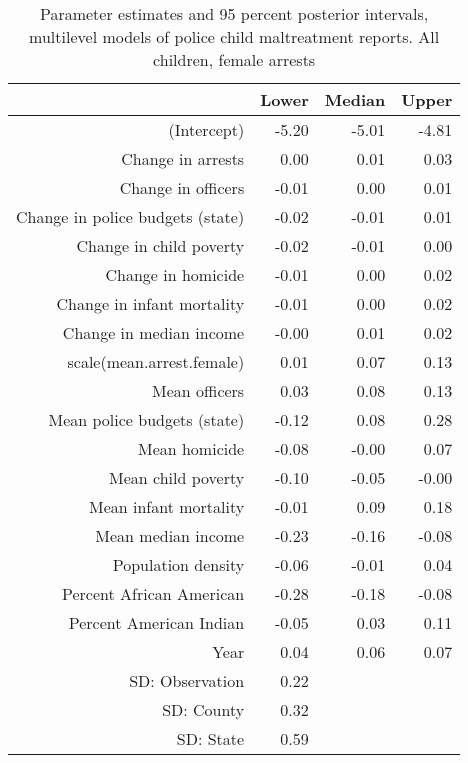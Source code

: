 \begin{table}[ht]
\centering
\begin{tabular}{rrrr}
  \hline
 & Lower & Median & Upper \\ 
  \hline
(Intercept) & -5.20 & -5.01 & -4.81 \\ 
  Change in arrests & 0.00 & 0.01 & 0.03 \\ 
  Change in officers & -0.01 & 0.00 & 0.01 \\ 
  Change in police budgets (state) & -0.02 & -0.01 & 0.01 \\ 
  Change in child poverty & -0.02 & -0.01 & 0.00 \\ 
  Change in homicide & -0.01 & 0.00 & 0.02 \\ 
  Change in infant mortality & -0.01 & 0.00 & 0.02 \\ 
  Change in median income & -0.00 & 0.01 & 0.02 \\ 
  scale(mean.arrest.female) & 0.01 & 0.07 & 0.13 \\ 
  Mean officers & 0.03 & 0.08 & 0.13 \\ 
  Mean police budgets (state) & -0.12 & 0.08 & 0.28 \\ 
  Mean homicide & -0.08 & -0.00 & 0.07 \\ 
  Mean child poverty & -0.10 & -0.05 & -0.00 \\ 
  Mean infant mortality & -0.01 & 0.09 & 0.18 \\ 
  Mean median income & -0.23 & -0.16 & -0.08 \\ 
  Population density & -0.06 & -0.01 & 0.04 \\ 
  Percent African American & -0.28 & -0.18 & -0.08 \\ 
  Percent American Indian & -0.05 & 0.03 & 0.11 \\ 
  Year & 0.04 & 0.06 & 0.07 \\ 
  SD: Observation & 0.22 &  &  \\ 
  SD: County & 0.32 &  &  \\ 
  SD: State & 0.59 &  &  \\ 
   \hline
\end{tabular}
\caption{Parameter estimates and 95 percent posterior intervals, multilevel models of 
             police child maltreatment reports. All children, female arrests} 
\end{table}
